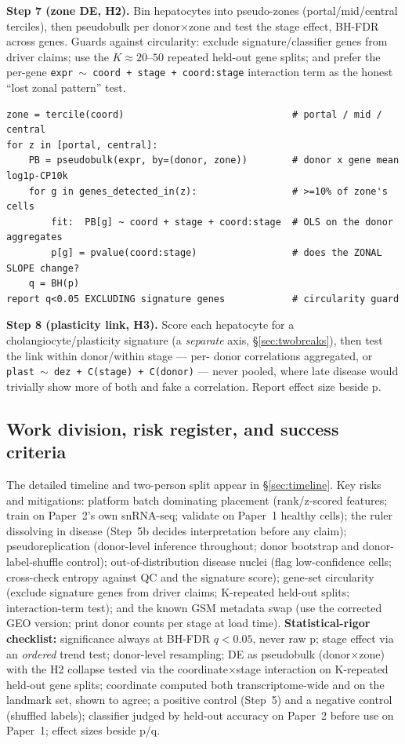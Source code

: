 \documentclass[11pt]{article}
\newcommand{\code}[1]{\texttt{#1}}
\begin{document}
\textbf{Step 7 (zone DE, H2).} Bin hepatocytes into pseudo-zones (portal/mid/central terciles), then
pseudobulk per donor$\times$zone and test the stage effect, BH-FDR across genes. Guards against
circularity: exclude signature/classifier genes from driver claims; use the $K\approx20$--$50$ repeated
held-out gene splits; and prefer the per-gene \code{expr $\sim$ coord + stage + coord:stage} interaction
term as the honest ``lost zonal pattern'' test.
\begin{verbatim}
zone = tercile(coord)                              # portal / mid / central
for z in [portal, central]:
    PB = pseudobulk(expr, by=(donor, zone))        # donor x gene mean log1p-CP10k
    for g in genes_detected_in(z):                 # >=10% of zone's cells
        fit:  PB[g] ~ coord + stage + coord:stage  # OLS on the donor aggregates
        p[g] = pvalue(coord:stage)                 # does the ZONAL SLOPE change?
    q = BH(p)
report q<0.05 EXCLUDING signature genes            # circularity guard
\end{verbatim}

\textbf{Step 8 (plasticity link, H3).} Score each hepatocyte for a cholangiocyte/plasticity signature
(a \emph{separate} axis, \S\ref{sec:twobreaks}), then test the link within donor/within stage --- per-
donor correlations aggregated, or \code{plast $\sim$ dez + C(stage) + C(donor)} --- never pooled, where
late disease would trivially show more of both and fake a correlation. Report effect size beside p.

\subsection{Work division, risk register, and success criteria}

The detailed timeline and two-person split appear in \S\ref{sec:timeline}. Key risks and mitigations:
platform batch dominating placement (rank/z-scored features; train on Paper~2's own snRNA-seq; validate
on Paper~1 healthy cells); the ruler dissolving in disease (Step~5b decides interpretation before any
claim); pseudoreplication (donor-level inference throughout; donor bootstrap and donor-label-shuffle
control); out-of-distribution disease nuclei (flag low-confidence cells; cross-check entropy against QC
and the signature score); gene-set circularity (exclude signature genes from driver claims; K-repeated
held-out splits; interaction-term test); and the known GSM metadata swap (use the corrected GEO version;
print donor counts per stage at load time). \textbf{Statistical-rigor checklist:} significance always at
BH-FDR $q<0.05$, never raw p; stage effect via an \emph{ordered} trend test; donor-level resampling;
DE as pseudobulk (donor$\times$zone) with the H2 collapse tested via the coordinate$\times$stage
interaction on K-repeated held-out gene splits; coordinate computed both transcriptome-wide and on the
landmark set, shown to agree; a positive control (Step~5) and a negative control (shuffled labels);
classifier judged by held-out accuracy on Paper~2 before use on Paper~1; effect sizes beside p/q.
\end{document}
